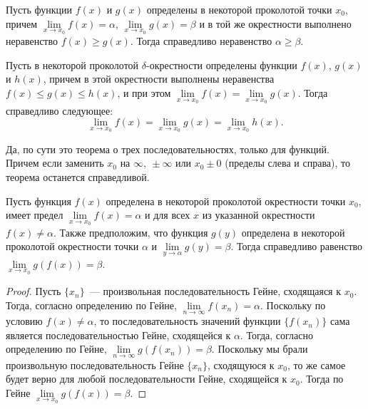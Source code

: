 \begin{corollary}
Пусть функции \(f(x)\) и \(g(x)\) определены в некоторой проколотой
 точки \(x_{0}\), причем
\(\lim\limits_{x\to x_{0}} f(x) = \alpha\),
\(\lim\limits_{x\to x_{0}} g(x) = \beta\) и в той же окрестности выполнено неравенство
\(f(x) \geq g(x)\). Тогда справедливо неравенство \(\alpha \geq \beta\).
\end{corollary}

\begin{theorem}
Пусть в некоторой проколотой \(\delta\)-окрестности определены функции \(f(x)\), \(g(x)\)
и \(h(x)\), причем в этой окрестности выполнены неравенства \(f(x) \leq g(x) \leq h(x)\),
и при этом \(\lim\limits_{x \to x_{0}} f(x) = \lim\limits_{x \to x_{0}} g(x)\).
Тогда справедливо следующее:
\[
\lim_{ x \to x_{0} }f(x) = \lim_{ x \to x_{0} } g(x) = \lim_{ x \to x_{0} }h(x).
\]
\end{theorem}

\begin{note}
Да, по сути это теорема о трех последовательностях, только для функций.
Причем если заменить \(x_{0}\) на \(\infty, ~ \pm \infty\) или \(x_{0} \pm 0\)
(пределы слева и справа), то теорема останется справедливой.
\end{note}


\begin{theorem}
Пусть функция \(f(x)\) определена в некоторой проколотой окрестности точки \(x_{0}\),
имеет предел \(\lim\limits_{x \to x_{0}} f(x) = \alpha\) и для всех \(x\) из указанной окрестности
\(f(x) \neq \alpha\). Также предположим, что функция \(g(y)\) определена в некоторой проколотой
окрестности точки \(\alpha\) и \(\lim\limits_{y \to \alpha} g(y) = \beta\).
Тогда справедливо равенство \(\lim\limits_{x \to x_{0}} g(f(x)) = \beta\).

\begin{proof}
Пусть \(\{x_{n}\}\)~--- произвольная последовательность Гейне, сходящаяся к \(x_{0}\).
Тогда, согласно определению по Гейне, \(\lim\limits_{n \to \infty} f(x_{n}) = \alpha\).
Поскольку по условию \(f(x) \neq \alpha\), то последовательность значений функции
\(\{f(x_{n})\}\) сама является последовательностью Гейне, сходящейся к \(\alpha\).
Тогда, согласно определению по Гейне, \(\lim\limits_{n \to \infty} g(f(x_{n})) = \beta\).
Поскольку мы брали произвольную последовательность Гейне \(\{x_{n}\}\), сходящуюся к \(x_{0}\),
то же самое будет верно для любой последовательности Гейне, сходящейся к \(x_{0}\).
Тогда по Гейне \(\lim\limits_{x \to x_{0}} g(f(x)) = \beta\).
\end{proof}
\end{theorem}

